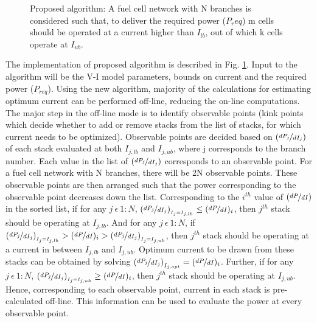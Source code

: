 \documentclass[twocolumn]{autart}
\begin{document}
\begin{figure}[h]
\caption{Proposed algorithm: A fuel cell network with N branches is considered such that, to deliver the required power ($P_req$) m cells should be operated at a current higher than $I_{lb}$, out of which k cells operate at $I_{ub}$.}\label{algo}
\end{figure}
The implementation of proposed algorithm is described in Fig. \ref{algo}. Input to the algorithm will be the V-I model parameters, bounds on current and the required power ($P_{req}$). Using the new algorithm, majority of the calculations for estimating optimum current can be performed off-line, reducing the on-line computations. The major step in the off-line mode is to identify observable points (kink points which decide whether to add or remove stacks from the list of stacks, for which current needs to be optimized). Observable points are decided based on $(\nicefrac{dP_{j}} {dI_j})$ of each stack evaluated at both $I_{j,lb}$ and $I_{j,ub}$, where j corresponds to the branch number. Each value in the list of $(\nicefrac{dP_{j}} {dI_j})$ corresponds to an observable point. For a fuel cell network with N branches, there will be 2N observable points. These observable points are then arranged such that the power corresponding to the observable point decreases down the list. Corresponding to the $i^{th}$ value of $(\nicefrac{dP} {dI})$ in the sorted list, if for any $j \ \epsilon \ 1:N$, $(\nicefrac{dP_{j}}{dI_j})_{_{I_j= I_{j,lb}}} \leq (\nicefrac{dP}{dI})_i$, then $j^{th}$ stack should be operating at $I_{j,lb}$. And for any  $j \ \epsilon \ 1:N$, if $(\nicefrac{dP_{j}}{dI_j})_{_{I_j=I_{j,lb}}} > (\nicefrac{dP}{dI})_i > (\nicefrac{dP_{j}}{dI_j})_{_{I_j=I_{j,ub}}}$, then $j^{th}$ stack should be operating at a current in between $I_{j,lb}$ and $I_{j,ub}$. Optimum current to be drawn from these stacks can be obtained by solving $\left(\nicefrac{dP_j}{dI_j}\right)_{I_{j,opt}} = (\nicefrac{dP}{dI})_i$. Further, if for any $j \ \epsilon \ 1:N$, $(\nicefrac{dP_{j}}{dI_j})_{_{I_j= I_{j,ub}}} \geq (\nicefrac{dP}{dI})_i$, then $j^{th}$ stack should be operating at $I_{j,ub}$. Hence, corresponding to each observable point, current in each stack is pre-calculated off-line. This information can be used to evaluate the power at every observable point.
\end{document}
